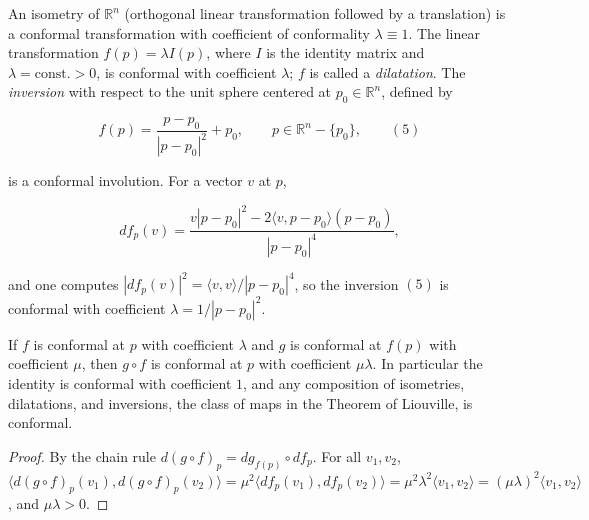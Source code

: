 \begin{example}
  \label{ex:dc-ch8-5-1}
  \leanok
\sketch
  An isometry of $\mathbb{R}^n$ (orthogonal linear transformation followed by a
  translation) is a conformal transformation with coefficient of conformality
  $\lambda\equiv 1$. The linear transformation $f(p)=\lambda I(p)$, where $I$ is the
  identity matrix and $\lambda=\text{const.}>0$, is conformal with coefficient
  $\lambda$; $f$ is called a \emph{dilatation}. The \emph{inversion} with respect to the unit
  sphere centered at $p_0\in\mathbb{R}^n$, defined by


  $$
  f(p)=\frac{p-p_0}{|p-p_0|^2}+p_0,\qquad p\in\mathbb{R}^n-\{p_0\},\qquad(5)
  $$


  is a conformal involution. For a vector $v$ at $p$,


  $$
  df_p(v)=\frac{v|p-p_0|^2-2\langle v,p-p_0\rangle(p-p_0)}{|p-p_0|^4},
  $$


  and one computes $|df_p(v)|^2=\langle v,v\rangle/|p-p_0|^4$, so the inversion $(5)$
  is conformal with coefficient $\lambda=1/|p-p_0|^2$.
\end{example}

\begin{lemma}
  \label{lem:dc-ch8-5-conformal-comp}
  \leanok
  If $f$ is conformal at $p$ with coefficient $\lambda$ and $g$ is conformal at
  $f(p)$ with coefficient $\mu$, then $g\circ f$ is conformal at $p$ with
  coefficient $\mu\lambda$. In particular the identity is conformal with
  coefficient $1$, and any composition of isometries, dilatations, and inversions,
  the class of maps in the Theorem of Liouville, is conformal.
\end{lemma}
\begin{proof}
  \leanok
\sketch
  By the chain rule $d(g\circ f)_p=dg_{f(p)}\circ df_p$. For all $v_1,v_2$,
  $\langle d(g\circ f)_p(v_1),d(g\circ f)_p(v_2)\rangle
  =\mu^2\langle df_p(v_1),df_p(v_2)\rangle
  =\mu^2\lambda^2\langle v_1,v_2\rangle=(\mu\lambda)^2\langle v_1,v_2\rangle$,
  and $\mu\lambda>0$.
\end{proof}

